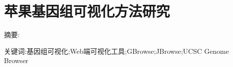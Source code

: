 \chapter*{苹果基因组可视化方法研究}

\vspace{1em}
{\large {\heiti 摘要: }}\normalsize{\songti 

}

{\large {\heiti 关键词:}}\normalsize{基因组可视化;Web端可视化工具;GBrowse;JBrowse;UCSC Genome Browser}
\thispagestyle{empty}